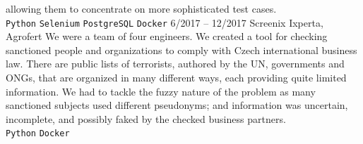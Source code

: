 \documentclass[10pt,A4]{article}
\begin{document}
\begin{entrylist}
{		allowing them to concentrate on more sophisticated test cases. 
		\\ 
		\texttt{Python}\slashsep
		\texttt{Selenium}\slashsep
		\texttt{PostgreSQL}\slashsep
		\texttt{Docker}
		}
	\entry
		{6/2017 -- 12/2017}
		{Screenix}
		{Ixperta, Agrofert}
		{We were a team of four engineers. We created a tool for checking sanctioned people
		and organizations to comply with Czech international business law. There are public
		lists of terrorists, authored by the UN, governments and ONGs, that are organized in
		many different ways, each providing quite limited information. We had to tackle the
		fuzzy nature of the problem as many sanctioned subjects used different pseudonyms;
		and information was uncertain, incomplete, and possibly faked by the checked
		business partners.
		\\ 
		\texttt{Python}\slashsep
		\texttt{Docker}
		}
\end{entrylist}



\vfill
%
%
%
%
%
%
\end{document}
